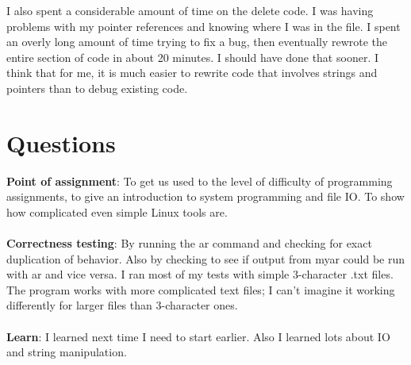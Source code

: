 \documentclass[11pt]{article}
\begin{document}
I also spent a considerable amount of time on the delete code. I was having problems with my pointer references and knowing where I was in the file. I spent an overly long amount of time trying to fix a bug, then eventually rewrote the entire section of code in about 20 minutes. I should have done that sooner. I think that for me, it is much easier to rewrite code that involves strings and pointers than to debug existing code. \\

\section{Questions}
\textbf{Point of assignment}: To get us used to the level of difficulty of programming assignments, to give an introduction to system programming and file IO. To show how complicated even simple Linux tools are. \\ \\
\textbf{Correctness testing}: By running the ar command and checking for exact duplication of behavior. Also by checking to see if output from myar could be run with ar and vice versa. I ran most of my tests with simple 3-character .txt files. The program works with more complicated text files; I can't imagine it working differently for larger files than 3-character ones. \\ \\
\textbf{Learn}: I learned next time I need to start earlier. Also I learned lots about IO and string manipulation.\\ \\
\end{document}

